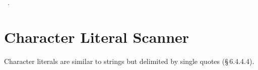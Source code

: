 \documentclass[11pt,a4paper,twoside,openright,DIV=15]{scrbook}
\theoremstyle{definition}
\theoremstyle{plain}
\theoremstyle{remark}
\newcommand{\stdref}[1]{\S\,#1}
\begin{document}
\begin{flushleft}
\begin{minipage}{\linewidth}
\vspace{-1.5ex}
\footnotesize
\begin{list}{}{\setlength{\itemsep}{-\parsep}\setlength{\itemindent}{-\leftmargin}}
\item \NWtxtMacroRefIn\ .

\item{}
\end{list}
\end{minipage}\vspace{4ex}
\end{flushleft}
\section{Character Literal Scanner}

Character literals are similar to strings but delimited by single
quotes (\stdref{6.4.4.4}).
\end{document}
